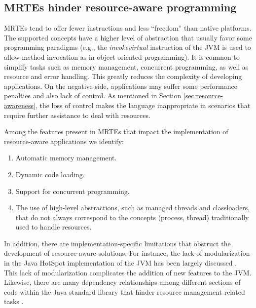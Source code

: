 \subsection{MRTEs hinder resource-aware programming}

MRTEs tend to offer fewer instructions and less ``freedom'' than native platforms.
The supported concepts have a higher level of abstraction that usually favor some programming paradigms (e.g., the \textit{invokevirtual} instruction of the JVM is used to allow method invocation as in object-oriented programming).
It is common to simplify tasks such as memory management, concurrent programming, as well as resource and error handling.
This greatly reduces the complexity of developing applications.
On the negative side, applications may suffer some performance penalties and also lack of control.
As mentioned in Section \ref{sec:resource-awareness}, the loss of control makes the language inappropriate in scenarios that require further assistance to deal with resources.

Among the features present in MRTEs that impact the implementation of resource-aware applications we identify:
\begin{enumerate}
\item Automatic memory management.
\item Dynamic code loading.
\item Support for concurrent programming.
\item The use of high-level abstractions, such as managed threads and classloaders,  that do not always correspond to the concepts (process, thread) traditionally used to handle resources.
\end{enumerate}
In addition, there are implementation-specific limitations that obstruct the development of resource-aware solutions.
For instance, the lack of modularization in the Java HotSpot implementation of the JVM has been largely discussed \cite{Doyle2002,Fong:2004:PVM:1028976.1029010,1420998}.
This lack of modularization complicates the addition of new features to the JVM.
Likewise, there are many dependency relationships among different sections of code within the Java standard library that hinder resource management related tasks \cite{Blackburn2008,Kell:2012:JOE:2414740.2414747}.

%
%
%
%
%

